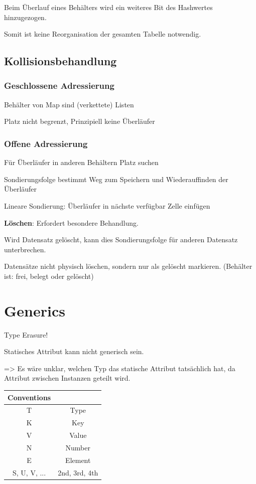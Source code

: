 \begin{multicols*}{4}
	Beim Überlauf eines Behälters wird ein weiteres Bit des Hashwertes hinzugezogen.
	
	Somit ist keine Reorganisation der gesamten Tabelle notwendig.
		
	\subsection{Kollisionsbehandlung}
		\subsubsection{Geschlossene Adressierung}
		Behälter von Map sind (verkettete) Listen
		
		Platz nicht begrenzt, Prinzipiell keine Überläufer
		
		\subsubsection{Offene Adressierung}
		Für Überläufer in anderen Behältern Platz suchen
		
		Sondierungsfolge bestimmt Weg zum Speichern und Wiederauffinden der Überläufer
		
		Lineare Sondierung: Überläufer in nächste verfügbar Zelle einfügen
		
		\textbf{Löschen}: Erfordert besondere Behandlung.
		
		Wird Datensatz gelöscht, kann dies Sondierungsfolge für anderen Datensatz unterbrechen.
		
		Datensätze nicht physisch löschen, sondern nur als gelöscht markieren. (Behälter ist: frei, belegt oder gelöscht)

\section{Generics}
Type Erasure!

Statisches Attribut kann nicht generisch sein.

=> Es wäre unklar, welchen Typ das statische Attribut tatsächlich hat, da Attribut zwischen Instanzen geteilt wird.

	\begin{tabular}{c | c}
		\textbf{Conventions} &  \\
		\hline
		T & Type \\
		K & Key \\
		V & Value \\
		N & Number \\
		E & Element \\
		S, U, V, ... & 2nd, 3rd, 4th \\
	\end{tabular}


\end{multicols*}
